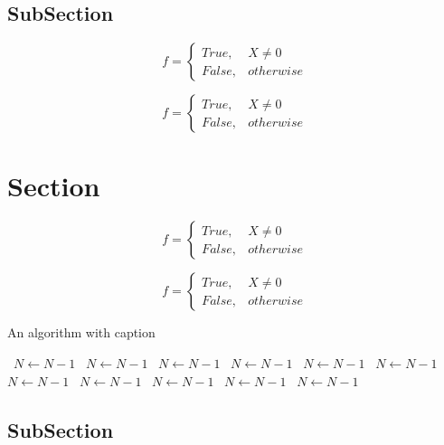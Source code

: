 \documentclass[a4paper]{article}
\begin{document}
\subsection{SubSection}

\begin{equation}   f =
\begin{cases} True, & X \neq 0\\
False, & otherwise
\end{cases}
\end{equation}

\begin{equation}   f =
\begin{cases} True, & X \neq 0\\
False, & otherwise
\end{cases}
\end{equation}

\section{Section}

\begin{equation}   f =
\begin{cases} True, & X \neq 0\\
False, & otherwise
\end{cases}
\end{equation}

\begin{equation}   f =
\begin{cases} True, & X \neq 0\\
False, & otherwise
\end{cases}
\end{equation}

\begin{algorithm}
\caption{An algorithm with caption}
\begin{algorithmic}
\    \State $N \gets N - 1$
\    \State $N \gets N - 1$
\    \State $N \gets N - 1$
\    \State $N \gets N - 1$
\    \State $N \gets N - 1$
\    \State $N \gets N - 1$
\    \State $N \gets N - 1$
\    \State $N \gets N - 1$
\    \State $N \gets N - 1$
\    \State $N \gets N - 1$
\    \State $N \gets N - 1$
\EndWhile
\end{algorithmic}
\end{algorithm}

\subsection{SubSection}
\end{document}
